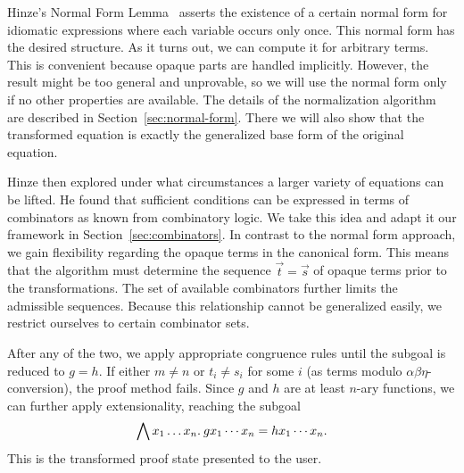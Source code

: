 Hinze's Normal Form Lemma~\cite[7]{hinze10} asserts the existence of a certain
normal form for idiomatic expressions where each variable occurs only once.
This normal form has the desired structure.
As it turns out, we can compute it for arbitrary terms.
This is convenient because opaque parts are handled implicitly.
However, the result might be too general and unprovable, so we will use the
normal form only if no other properties are available.
The details of the normalization algorithm are described in
Section~\ref{sec:normal-form}.
There we will also show that the transformed equation is exactly the generalized
base form of the original equation.

Hinze then explored under what circumstances a larger variety of equations can
be lifted.
He found that sufficient conditions can be expressed in terms of combinators
as known from combinatory logic.
We take this idea and adapt it our framework in Section~\ref{sec:combinators}.
In contrast to the normal form approach, we gain flexibility regarding the
opaque terms in the canonical form.
This means that the algorithm must determine the sequence $\vec t = \vec s$
of opaque terms prior to the transformations.
The set of available combinators further limits the admissible sequences.
Because this relationship cannot be generalized easily, we restrict ourselves
to certain combinator sets.

After any of the two, we apply appropriate congruence rules until the subgoal is
reduced to $g = h$.
If either $m \ne n$ or $t_i \ne s_i$ for some $i$ (as terms modulo
$\alpha\beta\eta$-conversion), the proof method fails.
Since $g$ and $h$ are at least $n$-ary functions, we can further apply
extensionality, reaching the subgoal
\[ \bigwedge x_1 \dots x_n.\>g x_1 \cdots x_n = h x_1 \cdots x_n. \]
This is the transformed proof state presented to the user.
